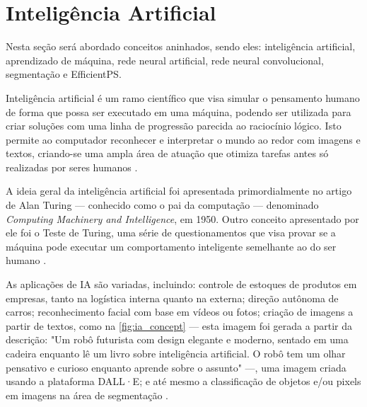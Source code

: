 \section{Inteligência Artificial}

Nesta seção será abordado conceitos aninhados, sendo eles: inteligência artificial, aprendizado de máquina, rede neural artificial, rede neural convolucional, segmentação e EfficientPS.

Inteligência artificial é um ramo científico que visa simular o pensamento humano de forma que possa ser executado em uma máquina, podendo ser utilizada para criar soluções com uma linha de progressão parecida ao raciocínio lógico. Isto permite ao computador reconhecer e interpretar o mundo ao redor com imagens e textos, criando-se uma ampla área de atuação que otimiza tarefas antes só realizadas por seres humanos \space\cite{ia_aliada_ou_inimiga}.



A ideia geral da inteligência artificial foi apresentada primordialmente no artigo de Alan Turing — conhecido como o pai da computação — denominado \textit{Computing Machinery and Intelligence}, em 1950. Outro conceito apresentado por ele foi o Teste de Turing, uma série de questionamentos que visa provar se a máquina pode executar um comportamento inteligente semelhante ao do ser humano \space\cite{NationalGeographic2023}.

As aplicações de IA são variadas, incluindo: controle de estoques de produtos em empresas, tanto na logística interna quanto na externa; direção autônoma de carros; reconhecimento facial com base em vídeos ou fotos; criação de imagens a partir de textos, como na \cref{fig:ia_concept} — esta imagem foi gerada a partir da descrição: "Um robô futurista com design elegante e moderno, sentado em uma cadeira enquanto lê um livro sobre inteligência artificial. O robô tem um olhar pensativo e curioso enquanto aprende sobre o assunto" —, uma imagem criada usando a plataforma DALL·E; e até mesmo a classificação de objetos e/ou pixels em imagens na área de segmentação \space\cite{Stefanini, OpenAI2021}.

